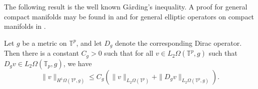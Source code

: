     The following result is the well known G\aa rding's inequality. A proof for general compact manifolds may be found in \cite[Theorem 2.44]{rosenberg} {  and for general elliptic operators on compact manifolds in \cite[Theorem 5.2]{Lawson-Michelsohn-1989}. }
    \begin{lem}\label{gardings inequality}
        Let $g$ be a metric on $\mathbb{T}^p$, and let $D_g$ denote the corresponding Dirac operator. Then there is a constant $C_g >0$ such that for all $v \in L_2\Omega(\mathbb{T}^p,g)$ such
        that $D_gv \in L_2\Omega(\mathbb{T}_p,g)$, we have
        \begin{equation*}
            \|v\|_{H^1\Omega(\mathbb{T}^p,g)} \leq C_g(\|v\|_{L_2\Omega(\mathbb{T}^p)}+\|D_gv\|_{L_2\Omega(\mathbb{T}^p,g)}).
        \end{equation*}
    \end{lem}
    
